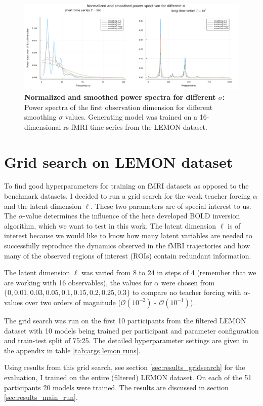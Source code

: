 \begin{figure}
    \includegraphics[width=\textwidth]{Images/power_spectrum_sigma_comp.png}
    \caption[Normalized and smoothed power spectra for different $\sigma$]{\textbf{Normalized and smoothed power spectra for different $\sigma$: }  Power spectra of the first
    observation dimension for different smoothing $\sigma$ values. Generating model was trained on a 16-dimensional rs-fMRI time series from the LEMON dataset.}
    \label{fig:power_spectrum_sigma_comp}
\end{figure}


\section{Grid search on LEMON dataset}

To find good hyperparameters for training on fMRI datasets as opposed to the benchmark datasets, I decided to run a grid search for the weak teacher forcing $\alpha$ 
and the latent dimension $\ell$. These two parameters are of special interest to us. The $\alpha$-value determines the influence of the here developed BOLD inversion algorithm,
which we want to test in this work. 
The latent dimension $\ell$ is of interest because we would like to know how many latent variables are needed to successfully reproduce the dynamics 
observed in the fMRI trajectories and how many of the observed regions of interest (ROIs) contain redundant information.

The latent dimension $\ell$ was varied from 8 to 24 in steps of 4 (remember that we are working with 16 observables), the values for $\alpha$ were chosen from 
\newline $\{0, 0.01, 0.03, 0.05, 0.1, 0.15, 0.2, 0.25, 0.3\}$ to compare no teacher forcing with $\alpha$-values 
over two orders of magnitude ($\mathcal{O}(10^{-2})$ - $\mathcal{O}(10^{-1})$).

The grid search was run on the first 10 participants from the filtered LEMON dataset with 10 models being trained per participant and parameter configuration and 
train-test split of 75:25. The detailed hyperparameter settings are given in the appendix in table \ref{tab:args lemon runs}.

Using results from this grid search, see section \ref{sec:results_gridsearch} for the evaluation, I trained on the entire (filtered) LEMON dataset. On each of the 51
participants 20 models were trained. The results are discussed in section \ref{sec:results_main_run}.

